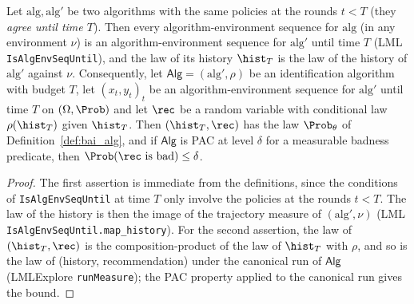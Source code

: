 \begin{lemma}\label{lem:prefix_transfer}
\leanok
{}
Let $\mathrm{alg}, \mathrm{alg}'$ be two algorithms with the same policies at the rounds
$t < T$ (they \emph{agree until time $T$}). Then every
algorithm-environment sequence for $\mathrm{alg}$ (in any environment $\nu$) is an
algorithm-environment sequence for $\mathrm{alg}'$ until time $T$ (LML
\texttt{IsAlgEnvSeqUntil}), and the law of its history $\hist_{T}$ is the law of the history
of $\mathrm{alg}'$ against $\nu$. Consequently, let $\mathsf{Alg} = (\mathrm{alg}', \rho)$ be an
identification algorithm with budget $T$, let $(x_t, y_t)_t$ be an algorithm-environment
sequence for $\mathrm{alg}'$ until time $T$ on $(\Omega, \Prob)$ and let $\rec$ be a random
variable with conditional law $\rho(\hist_{T})$ given $\hist_{T}$. Then
$(\hist_{T}, \rec)$ has the law $\Prob_\theta$ of Definition~\ref{def:bai_alg}, and if
$\mathsf{Alg}$ is PAC at level $\delta$ for a measurable badness predicate, then
$\Prob(\rec \text{ is bad}) \le \delta$.
\end{lemma}

\begin{proof}
\leanok
{}
The first assertion is immediate from the definitions, since the conditions of
\texttt{IsAlgEnvSeqUntil} at time $T$ only involve the policies at the rounds $t < T$. The law of
the history is then the image of the trajectory measure of $(\mathrm{alg}', \nu)$ (LML
\texttt{IsAlgEnvSeqUntil.map\_history}). For the second
assertion, the law of $(\hist_{T}, \rec)$ is the composition-product of the law of
$\hist_{T}$ with $\rho$, and so is the law of (history, recommendation) under the canonical
run of $\mathsf{Alg}$ (LMLExplore \texttt{runMeasure}); the PAC property
applied to the canonical run gives the bound.
\end{proof}

